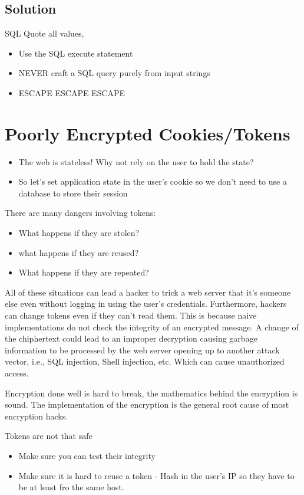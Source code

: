 \documentclass[../CMPUT-404-Notes.tex]{subfiles}
\begin{document}
\subsection{Solution}
SQL Quote all values,
\begin{itemize}
    \item Use the SQL execute statement
    \item NEVER craft a SQL query purely from input strings
    \item ESCAPE ESCAPE ESCAPE
\end{itemize}

\section{Poorly Encrypted Cookies/Tokens}
\begin{itemize}
    \item The web is stateless! Why not rely on the user
    to hold the state?
    \item So let's set application state in the user's
    cookie so we don't need to use a database to
    store their session
\end{itemize}

There are many dangers involving tokens:
\begin{itemize}
  \item What happens if they are stolen? 
  \item what happens if they are reused?
  \item What happens if they are repeated?
\end{itemize}
All of these situations can lead a hacker to trick a web server that it's someone else even without logging in using the user's credentials.
Furthermore, hackers can change tokens even if they can't read them.
This is because naive implementations do not check the integrity of an encrypted message. 
A change of the chiphertext could lead to an improper decryption causing garbage information to be processed by the web server opening up to another attack vector, i.e., SQL injection, Shell injection, etc.
Which can cause unauthorized access.

\begin{Note}
  Encryption done well is hard to break, the mathematics behind the encryption is sound. The implementation of the encryption is the general root cause of most encryption hacks. 
\end{Note}

Tokens are not that safe
\begin{itemize}
  \item Make sure you can test their integrity 
  \item Make sure it is hard to reuse a token - Hash in the user's IP so they have to be at least fro the same host.
\end{itemize}
\end{document}
